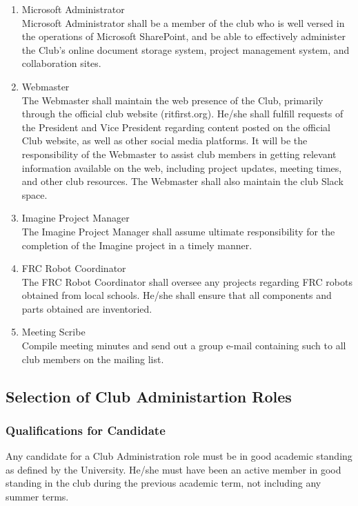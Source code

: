 \documentclass[english,11pt]{article}
\begin{document}
\begin{enumerate}[label=\Alph*.]
\item {\large Microsoft Administrator} \\
        Microsoft Administrator shall be a member of the club who is well versed in the operations of Microsoft SharePoint, and be able to effectively administer the Club’s online document storage system, project management system, and collaboration sites.
\item {\large Webmaster} \\
        The Webmaster shall maintain the web presence of the Club, primarily through the official club website (ritfirst.org).
        He/she shall fulfill requests of the President and Vice President regarding content posted on the official Club website, as well as other social media platforms.
        It will be the responsibility of the Webmaster to assist club members in getting relevant information available on the web, including project updates, meeting times, and other club resources.
        The Webmaster shall also maintain the club Slack space.
\item {\large Imagine Project Manager} \\
        The Imagine Project Manager shall assume ultimate responsibility for the completion of the Imagine project in a timely manner.
\item {\large FRC Robot Coordinator} \\
        The FRC Robot Coordinator shall oversee any projects regarding FRC robots obtained from local schools. He/she shall ensure that all components and parts obtained are inventoried.
\item {\large Meeting Scribe} \\
        Compile meeting minutes and send out a group e-mail containing such to all club members on the mailing list.
\end{enumerate}

\subsection{Selection of Club Administartion Roles}
\subsubsection{Qualifications for Candidate}
Any candidate for a Club Administration role must be in good academic standing as defined by the University.
He/she must have been an active member in good standing in the club during the previous academic term, not including any summer terms.
\end{document}
